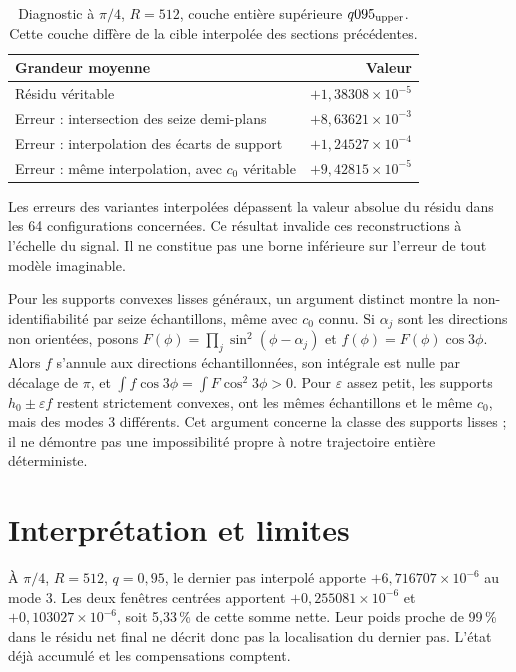 \documentclass[11pt,a4paper]{article}
\newcommand{\sci}[2]{#1\times10^{#2}}
\begin{document}
\begin{table}[h]\centering\small
\caption{Diagnostic à $\pi/4$, $R=512$, couche entière supérieure $q095_{\rm upper}$. Cette couche diffère de la cible interpolée des sections précédentes.}
\begin{tabular}{p{}r}\toprule
Grandeur moyenne & Valeur\\\midrule
Résidu véritable & $+\sci{1{,}38308}{-5}$\\
Erreur : intersection des seize demi-plans & $+\sci{8{,}63621}{-3}$\\
Erreur : interpolation des écarts de support & $+\sci{1{,}24527}{-4}$\\
Erreur : même interpolation, avec $c_0$ véritable & $+\sci{9{,}42815}{-5}$\\\bottomrule
\end{tabular}
\end{table}

Les erreurs des variantes interpolées dépassent la valeur absolue du résidu dans les 64 configurations concernées. Ce résultat invalide ces reconstructions à l'échelle du signal. Il ne constitue pas une borne inférieure sur l'erreur de tout modèle imaginable.

Pour les supports convexes lisses généraux, un argument distinct montre la non-identifiabilité par seize échantillons, même avec $c_0$ connu. Si $\alpha_j$ sont les directions non orientées, posons $F(\phi)=\prod_j\sin^2(\phi-\alpha_j)$ et $f(\phi)=F(\phi)\cos3\phi$. Alors $f$ s'annule aux directions échantillonnées, son intégrale est nulle par décalage de $\pi$, et $\int f\cos3\phi=\int F\cos^2 3\phi>0$. Pour $\varepsilon$ assez petit, les supports $h_0\pm\varepsilon f$ restent strictement convexes, ont les mêmes échantillons et le même $c_0$, mais des modes 3 différents. Cet argument concerne la classe des supports lisses ; il ne démontre pas une impossibilité propre à notre trajectoire entière déterministe.

\section{Interprétation et limites}
À $\pi/4$, $R=512$, $q=0{,}95$, le dernier pas interpolé apporte $+\sci{6{,}716707}{-6}$ au mode 3. Les deux fenêtres centrées apportent $+\sci{0{,}255081}{-6}$ et $+\sci{0{,}103027}{-6}$, soit 5,33\,\% de cette somme nette. Leur poids proche de 99\,\% dans le résidu net final ne décrit donc pas la localisation du dernier pas. L'état déjà accumulé et les compensations comptent.
\end{document}
